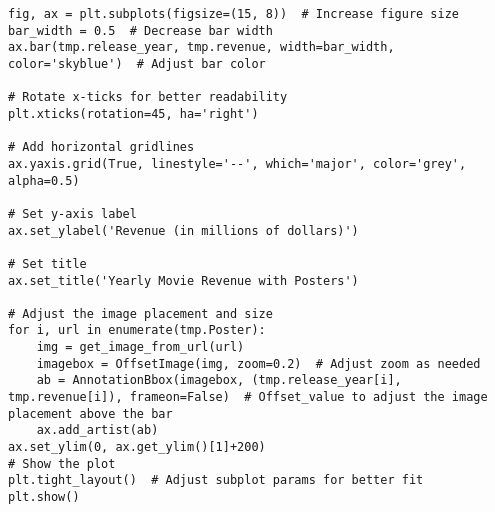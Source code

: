 \begin{lstlisting}
fig, ax = plt.subplots(figsize=(15, 8))  # Increase figure size
bar_width = 0.5  # Decrease bar width
ax.bar(tmp.release_year, tmp.revenue, width=bar_width, color='skyblue')  # Adjust bar color

# Rotate x-ticks for better readability
plt.xticks(rotation=45, ha='right')

# Add horizontal gridlines
ax.yaxis.grid(True, linestyle='--', which='major', color='grey', alpha=0.5)

# Set y-axis label
ax.set_ylabel('Revenue (in millions of dollars)')

# Set title
ax.set_title('Yearly Movie Revenue with Posters')

# Adjust the image placement and size
for i, url in enumerate(tmp.Poster):
    img = get_image_from_url(url)
    imagebox = OffsetImage(img, zoom=0.2)  # Adjust zoom as needed
    ab = AnnotationBbox(imagebox, (tmp.release_year[i], tmp.revenue[i]), frameon=False)  # Offset_value to adjust the image placement above the bar
    ax.add_artist(ab)
ax.set_ylim(0, ax.get_ylim()[1]+200)
# Show the plot
plt.tight_layout()  # Adjust subplot params for better fit
plt.show()
\end{lstlisting}

